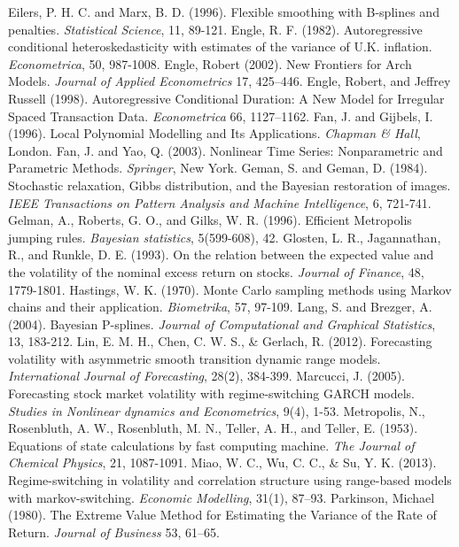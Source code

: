\documentclass[
journal=jacsat, %
manuscript=article]{achemso}
\begin{document}
\begin{CJK*}{UTF8}{song}
\begin{thebibliography}{99}
 Eilers, P. H. C. and Marx, B. D. (1996). Flexible smoothing with B-splines and penalties. {\it Statistical Science}, 11, 89-121.
 Engle, R. F. (1982). Autoregressive conditional heteroskedasticity with estimates of the variance of U.K. inflation. {\it Econometrica}, 50, 987-1008. 
 Engle, Robert (2002). New Frontiers for Arch Models. {\it Journal of Applied Econometrics} 17, 425–446.
 Engle, Robert, and Jeffrey Russell (1998). Autoregressive Conditional Duration: A New Model for Irregular Spaced Transaction Data. {\it Econometrica} 66, 1127–1162.
 Fan, J. and Gijbels, I. (1996). Local Polynomial Modelling and Its Applications. {\it Chapman \& Hall}, London.
 Fan, J. and Yao, Q. (2003). Nonlinear Time Series: Nonparametric and Parametric Methods. {\it Springer}, New York.
 Geman, S. and Geman, D. (1984). Stochastic relaxation, Gibbs distribution, and the Bayesian restoration of images. {\it IEEE Transactions on Pattern Analysis and Machine Intelligence}, 6, 721-741.
 Gelman, A., Roberts, G. O., and Gilks, W. R. (1996). Efficient Metropolis jumping rules. {\it Bayesian statistics}, 5(599-608), 42.
 Glosten, L. R., Jagannathan, R., and Runkle, D. E. (1993). On the relation between the expected value and the volatility of the nominal excess return on stocks. {\it Journal of Finance}, 48, 1779-1801.
 Hastings, W. K. (1970). Monte Carlo sampling methods using Markov chains and their application. {\it Biometrika}, 57, 97-109.
 Lang, S. and Brezger, A. (2004). Bayesian P-splines. {\it Journal of Computational and Graphical Statistics}, 13, 183-212.
 Lin, E. M. H., Chen, C. W. S., \& Gerlach, R. (2012). Forecasting volatility with asymmetric smooth transition dynamic range models. {\it International Journal of Forecasting}, 28(2), 384-399.
 Marcucci, J. (2005). Forecasting stock market volatility with regime-switching GARCH models. {\it Studies in Nonlinear dynamics and Econometrics}, 9(4), 1-53.
 Metropolis, N., Rosenbluth, A. W., Rosenbluth, M. N., Teller, A. H., and Teller, E. (1953). Equations of state calculations by fast computing machine. {\it The Journal of Chemical Physics}, 21, 1087-1091.
 Miao, W. C., Wu, C. C., \& Su, Y. K. (2013). Regime-switching in volatility and correlation structure using range-based models with markov-switching. {\it Economic Modelling}, 31(1), 87–93.
 Parkinson, Michael (1980). The Extreme Value Method for Estimating the Variance of the Rate of Return. {\it Journal of Business} 53, 61–65.

\end{thebibliography}
\end{CJK*}
\end{document}

